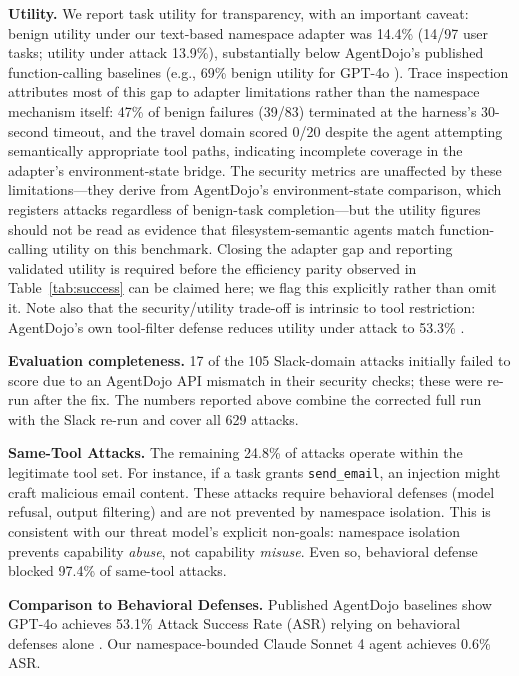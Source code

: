 \documentclass{article}
\begin{document}
\textbf{Utility.} We report task utility for transparency, with an important caveat: benign utility under our text-based namespace adapter was 14.4\% (14/97 user tasks; utility under attack 13.9\%), substantially below AgentDojo's published function-calling baselines (e.g., 69\% benign utility for GPT-4o \cite{debenedetti2024agentdojo}). Trace inspection attributes most of this gap to adapter limitations rather than the namespace mechanism itself: 47\% of benign failures (39/83) terminated at the harness's 30-second timeout, and the travel domain scored 0/20 despite the agent attempting semantically appropriate tool paths, indicating incomplete coverage in the adapter's environment-state bridge. The security metrics are unaffected by these limitations---they derive from AgentDojo's environment-state comparison, which registers attacks regardless of benign-task completion---but the utility figures should not be read as evidence that filesystem-semantic agents match function-calling utility on this benchmark. Closing the adapter gap and reporting validated utility is required before the efficiency parity observed in Table~\ref{tab:success} can be claimed here; we flag this explicitly rather than omit it. Note also that the security/utility trade-off is intrinsic to tool restriction: AgentDojo's own tool-filter defense reduces utility under attack to 53.3\% \cite{debenedetti2024agentdojo}.

\textbf{Evaluation completeness.} 17 of the 105 Slack-domain attacks initially failed to score due to an AgentDojo API mismatch in their security checks; these were re-run after the fix. The numbers reported above combine the corrected full run with the Slack re-run and cover all 629 attacks.

\textbf{Same-Tool Attacks.} The remaining 24.8\% of attacks operate within the legitimate tool set. For instance, if a task grants \texttt{send\_email}, an injection might craft malicious email content. These attacks require behavioral defenses (model refusal, output filtering) and are not prevented by namespace isolation. This is consistent with our threat model's explicit non-goals: namespace isolation prevents capability \textit{abuse}, not capability \textit{misuse}. Even so, behavioral defense blocked 97.4\% of same-tool attacks.

\textbf{Comparison to Behavioral Defenses.} Published AgentDojo baselines show GPT-4o achieves 53.1\% Attack Success Rate (ASR) relying on behavioral defenses alone \cite{debenedetti2024agentdojo}. Our namespace-bounded Claude Sonnet 4 agent achieves 0.6\% ASR.
\end{document}
